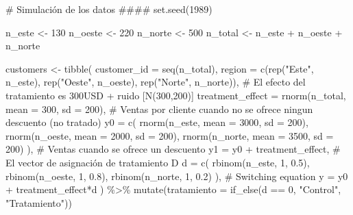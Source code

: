 \documentclass[
  letterpaper,
  DIV=11,
  numbers=noendperiod,
  oneside]{scrreprt}
\newenvironment{Shaded}{\begin{snugshade}}{\end{snugshade}}
\newcommand{\AttributeTok}[1]{\textcolor[rgb]{0.40,0.45,0.13}{#1}}
\newcommand{\CommentTok}[1]{\textcolor[rgb]{0.37,0.37,0.37}{#1}}
\newcommand{\DecValTok}[1]{\textcolor[rgb]{0.68,0.00,0.00}{#1}}
\newcommand{\FloatTok}[1]{\textcolor[rgb]{0.68,0.00,0.00}{#1}}
\newcommand{\FunctionTok}[1]{\textcolor[rgb]{0.28,0.35,0.67}{#1}}
\newcommand{\NormalTok}[1]{\textcolor[rgb]{0.00,0.23,0.31}{#1}}
\newcommand{\OtherTok}[1]{\textcolor[rgb]{0.00,0.23,0.31}{#1}}
\newcommand{\SpecialCharTok}[1]{\textcolor[rgb]{0.37,0.37,0.37}{#1}}
\newcommand{\StringTok}[1]{\textcolor[rgb]{0.13,0.47,0.30}{#1}}
\begin{document}
\begin{Shaded}
\begin{Highlighting}[]
\CommentTok{\# Simulación de los datos \#\#\#\#}
\FunctionTok{set.seed}\NormalTok{(}\DecValTok{1989}\NormalTok{)}

\NormalTok{n\_este }\OtherTok{\textless{}{-}} \DecValTok{130}
\NormalTok{n\_oeste }\OtherTok{\textless{}{-}} \DecValTok{220}
\NormalTok{n\_norte }\OtherTok{\textless{}{-}} \DecValTok{500}
\NormalTok{n\_total }\OtherTok{\textless{}{-}}\NormalTok{ n\_este }\SpecialCharTok{+}\NormalTok{ n\_oeste }\SpecialCharTok{+}\NormalTok{ n\_norte}

\NormalTok{customers }\OtherTok{\textless{}{-}}
  \FunctionTok{tibble}\NormalTok{(}
    \AttributeTok{customer\_id =} \FunctionTok{seq}\NormalTok{(n\_total),}
    \AttributeTok{region =} \FunctionTok{c}\NormalTok{(}\FunctionTok{rep}\NormalTok{(}\StringTok{"Este"}\NormalTok{, n\_este),}
               \FunctionTok{rep}\NormalTok{(}\StringTok{"Oeste"}\NormalTok{, n\_oeste),}
               \FunctionTok{rep}\NormalTok{(}\StringTok{"Norte"}\NormalTok{, n\_norte)),}
    \CommentTok{\# El efecto del tratamiento es 300USD + ruido [N(300,200)]}
    \AttributeTok{treatment\_effect =} \FunctionTok{rnorm}\NormalTok{(n\_total, }\AttributeTok{mean =} \DecValTok{300}\NormalTok{, }\AttributeTok{sd =} \DecValTok{200}\NormalTok{),}
    \CommentTok{\# Ventas por cliente cuando no se ofrece ning\textquotesingle{}un descuento (no tratado)}
    \AttributeTok{y0 =} \FunctionTok{c}\NormalTok{(}
      \FunctionTok{rnorm}\NormalTok{(n\_este, }\AttributeTok{mean =} \DecValTok{3000}\NormalTok{, }\AttributeTok{sd =} \DecValTok{200}\NormalTok{),}
      \FunctionTok{rnorm}\NormalTok{(n\_oeste, }\AttributeTok{mean =} \DecValTok{2000}\NormalTok{, }\AttributeTok{sd =} \DecValTok{200}\NormalTok{),}
      \FunctionTok{rnorm}\NormalTok{(n\_norte, }\AttributeTok{mean =} \DecValTok{3500}\NormalTok{, }\AttributeTok{sd =} \DecValTok{200}\NormalTok{)}
\NormalTok{    ),}
    \CommentTok{\# Ventas cuando se ofrece un descuento}
    \AttributeTok{y1 =}\NormalTok{ y0 }\SpecialCharTok{+}\NormalTok{ treatment\_effect,}
    \CommentTok{\# El vector de asignación de tratamiento D}
    \AttributeTok{d =} \FunctionTok{c}\NormalTok{(}
      \FunctionTok{rbinom}\NormalTok{(n\_este, }\DecValTok{1}\NormalTok{, }\FloatTok{0.5}\NormalTok{),}
      \FunctionTok{rbinom}\NormalTok{(n\_oeste, }\DecValTok{1}\NormalTok{, }\FloatTok{0.8}\NormalTok{),}
      \FunctionTok{rbinom}\NormalTok{(n\_norte, }\DecValTok{1}\NormalTok{, }\FloatTok{0.2}\NormalTok{)}
\NormalTok{    ),}
    \CommentTok{\# Switching equation}
    \AttributeTok{y =}\NormalTok{ y0 }\SpecialCharTok{+}\NormalTok{ treatment\_effect}\SpecialCharTok{*}\NormalTok{d}
\NormalTok{  ) }\SpecialCharTok{\%\textgreater{}\%}
  \FunctionTok{mutate}\NormalTok{(}\AttributeTok{tratamiento =} \FunctionTok{if\_else}\NormalTok{(d }\SpecialCharTok{==} \DecValTok{0}\NormalTok{, }\StringTok{"Control"}\NormalTok{, }\StringTok{"Tratamiento"}\NormalTok{))}


\end{Highlighting}
\end{Shaded}
\end{document}
